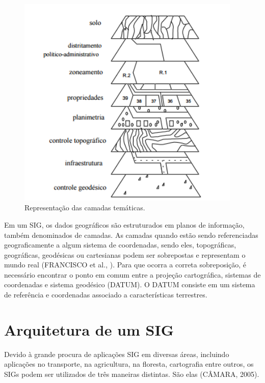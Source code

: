\documentclass[
	12pt,				%
    oneside,			%
	a4paper,			%
	english,			%
	french,				%
	spanish,			%
	brazil,				%
	]{abntex2}
\begin{document}
\begin{figure} [H]
\label{figura1} 
\caption{Representação das camadas temáticas.}
\includegraphics[width=0.95\textwidth]{camadatematica.png} %
\end{figure}

Em um SIG, os dados geográficos são estruturados em planos de informação, também denominados de camadas. As camadas quando estão sendo referenciadas geograficamente a algum sistema de coordenadas, sendo eles, topográficas, geográficas, geodésicas ou cartesianas podem ser sobrepostas e representam o mundo real (FRANCISCO et al.,  ). Para que ocorra a correta sobreposição, é necessário encontrar o ponto em comum entre a projeção cartográfica, sistemas de coordenadas e sistema geodésico (DATUM). O DATUM consiste em um sistema de referência e coordenadas associado a características terrestres.



\section{Arquitetura de um SIG}
Devido à grande procura de aplicações SIG em diversas áreas, incluindo aplicações no transporte, na agricultura, na floresta, cartografia entre outros, os SIGs podem ser utilizados de três maneiras distintas. São elas (CÂMARA, 2005).
\end{document}
